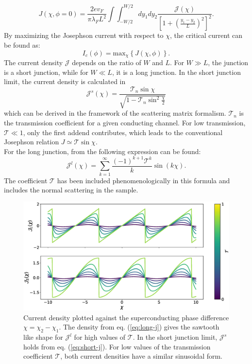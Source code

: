 \begin{equation}
J\left(\chi, \phi=0\right) = \frac{2 e v_F}{\pi \lambda_F L^2}  \int \int_{-W/2}^{W/2} d y_1 d y_2 \frac{\mathcal{J}(\chi)}{\left[ 1 + \left(\frac{y_1 - y_2}{L}\right)^2\right]^2}.
\label{eq:josephson_current_zero_b}
\end{equation}
By maximizing the Josephson current with respect to $\chi$, the critical current can be found as:
\begin{equation}
I_c(\phi) = \text{max}_{\chi}\left\{ J(\chi, \phi) \right\}\label{eq:josephson-relation}.
\end{equation}
The current density $\mathcal{J}$ depends on the ratio of $W$ and $L$. For $W \gg L$, the junction is a short junction, while for $W \ll L$, it is a long junction. 
In the short junction limit, the current density is calculated in \cite{Beenakker1991}
\begin{equation}
\mathcal{J}^s (\chi) = \frac{\mathcal{T}_n \sin \chi}{\sqrt{1 - \mathcal{T}_n \sin^2 \frac{\chi}{2}}}\label{eq:short-j}
\end{equation}
which can be derived in the framework of the scattering matrix formalism. $\mathcal{T}_n$ is the transmission coefficient for a given conducting channel. For low transmission, $\mathcal{T} \ll 1$, only the first addend contributes, which leads to the conventional Josephson relation $J \simeq \mathcal{T} \sin \chi$.\\
For the long junction, from \cite{Barzykin1999} the following expression can be found:
\begin{equation}
\mathcal{J}^l(\chi) = \sum_{k = 1}^{\infty} \frac{(-1)^{k+1} \mathcal{T}^k}{k} \sin( k \chi).\label{eq:long-j}
\end{equation}
The coefficient $\mathcal{T}$ has been included phenomenologically in this formula and includes the normal scattering in the sample.
\begin{figure}
\centering
\includegraphics[width=\textwidth]{figure/analyticalmodel/current_density_all}
\caption{Current density plotted against the superconducting phase difference $\chi = \chi_2 - \chi_1$. The density from eq. (\ref{eq:long-j}) gives the sawtooth like shape for $\mathcal{J}^l$ for high values of $\mathcal{T}$. In the short junction limit, $\mathcal{J}^s$ holds from eq. (\ref{eq:short-j}). For low values of the transmission coefficient $\mathcal{T}$, both current densities have a similar sinusoidal form. }
\label{fig:current_density}
\end{figure}
